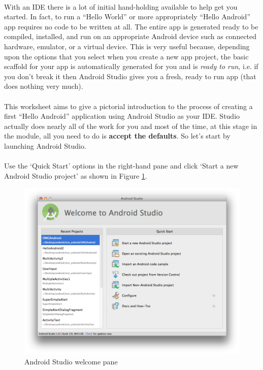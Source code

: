 \paragraph{} With an IDE there is a lot of initial hand-holding available to help get you started. In fact, to run a ``Hello World'' or more appropriately ``Hello Android'' app requires no code to be written at all. The entire app is generated ready to be compiled, installed, and run on an appropriate Android device such as connected hardware, emulator, or a virtual device. This is very useful because, depending upon the options that you select when you create a new app project, the basic scaffold for your app is automatically generated for you and is \emph{ready to run}, i.e. if you don't break it then Android Studio gives you a fresh, ready to run app (that does nothing very much). 

\paragraph{} This worksheet aims to give a pictorial introduction to the process of creating a first ``Hello Android'' application using Android Studio as your IDE. Studio actually does nearly all of the work for you and most of the time, at this stage in the module, all you need to do is {\bf{accept the defaults}}. So let's start by launching Android Studio.

\paragraph{} Use the `Quick Start' options in the right-hand pane and click `Start a new Android Studio project' as shown in Figure \ref{fig:android.studio_welcome}.

\begin{figure}[H]
\centering
\includegraphics[width=\textwidth]{images/android-studio_01_welcome}
\caption{Android Studio welcome pane}
\label{fig:android.studio_welcome}
\end{figure}


